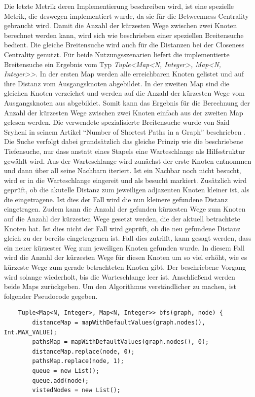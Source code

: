 \documentclass[a4paper,12pt,ngerman,chapterprefix=false,listof=totoc,bibliography=totoc]{scrreprt}
\begin{document}
{{{Die letzte Metrik deren Implementierung beschreiben wird, ist eine spezielle Metrik, die deswegen implementiert wurde, da sie für die Betweenness Centrality gebraucht wird. Damit die Anzahl der kürzesten Wege zwischen zwei Knoten berechnet werden kann, wird sich wie beschrieben einer speziellen Breitensuche bedient. Die gleiche Breitensuche wird auch für die Distanzen bei der Closeness Centrality genutzt. Für beide Nutzungsszenarien liefert die implementierte Breitensuche ein Ergebnis vom Typ \textit{Tuple\textless Map\textless N, Integer\textgreater , Map\textless N, Integer\textgreater\textgreater}. In der ersten Map werden alle erreichbaren Knoten gelistet und auf ihre Distanz vom Ausgangsknoten abgebildet. In der zweiten Map sind die gleichen Knoten verzeichet und werden auf die Anzahl der kürzesten Wege vom Ausgangsknoten aus abgebildet. Somit kann das Ergebnis für die Berechnung der Anzahl der kürzesten Wege zwischen zwei Knoten einfach aus der zweiten Map gelesen werden. Die verwendete spezialisierte Breitensuche wurde von Said Sryheni in seinem Artikel "`Number of Shortest Paths in a Graph"' beschrieben \cite{sryheni_number_2020}. Die Suche verfolgt dabei grundsätzlich das gleiche Prinzip wie die beschriebene Tiefensuche, nur dass anstatt eines Stapels eine Warteschlange als Hilfsstruktur gewählt wird. Aus der Warteschlange wird zunächst der erste Knoten entnommen und dann über all seine Nachbarn iteriert. Ist ein Nachbar noch nicht besucht, wird er in die Warteschlange eingereit und als besucht markiert. Zusätzlich wird geprüft, ob die akutelle Distanz zum jeweiligen adjazenten Knoten kleiner ist, als die eingetragene. Ist dies der Fall wird die nun kleinere gefundene Distanz eingetragen. Zudem kann die Anzahl der gefunden kürzesten Wege zum Knoten auf die Anzahl der kürzesten Wege gesetzt werden, die der aktuell betrachtete Knoten hat. Ist dies nicht der Fall wird geprüft, ob die neu gefundene Distanz gleich zu der bereits eingetragenen ist. Fall dies zutrifft, kann gesagt werden, dass ein neuer kürzester Weg zum jeweiligen Knoten gefunden wurde. In diesem Fall wird die Anzahl der kürzesten Wege für diesen Knoten um so viel erhöht, wie es kürzeste Wege zum gerade betrachteten Knoten gibt. Der beschriebene Vorgang wird solange wiederholt, bis die Warteschlange leer ist. Anschließend werden beide Maps zurückgeben. Um den Algorithmus verständlicher zu machen, ist folgender Pseudocode gegeben.
\begin{lstlisting}
	Tuple<Map<N, Integer>, Map<N, Integer>> bfs(graph, node) {
		distanceMap = mapWithDefaultValues(graph.nodes(), Int.MAX_VALUE);
		pathsMap = mapWithDefaultValues(graph.nodes(), 0);
		distanceMap.replace(node, 0);
		pathsMap.replace(node, 1);
		queue = new List();
		queue.add(node);
		vistedNodes = new List();


\end{lstlisting}}}}
\end{document}
